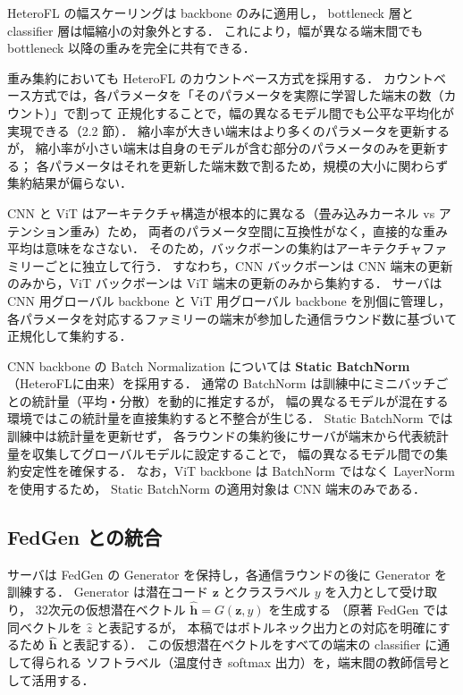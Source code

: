 HeteroFL の幅スケーリングは backbone のみに適用し，
bottleneck 層と classifier 層は幅縮小の対象外とする．
これにより，幅が異なる端末間でも bottleneck 以降の重みを完全に共有できる．

重み集約においても HeteroFL のカウントベース方式を採用する．
カウントベース方式では，各パラメータを「そのパラメータを実際に学習した端末の数（カウント）」で割って
正規化することで，幅の異なるモデル間でも公平な平均化が実現できる（2.2 節）．
縮小率が大きい端末はより多くのパラメータを更新するが，
縮小率が小さい端末は自身のモデルが含む部分のパラメータのみを更新する；
各パラメータはそれを更新した端末数で割るため，規模の大小に関わらず集約結果が偏らない．

CNN と ViT はアーキテクチャ構造が根本的に異なる（畳み込みカーネル vs アテンション重み）ため，
両者のパラメータ空間に互換性がなく，直接的な重み平均は意味をなさない．
そのため，バックボーンの集約はアーキテクチャファミリーごとに独立して行う．
すなわち，CNN バックボーンは CNN 端末の更新のみから，ViT バックボーンは ViT 端末の更新のみから集約する．
サーバは CNN 用グローバル backbone と ViT 用グローバル backbone を別個に管理し，
各パラメータを対応するファミリーの端末が参加した通信ラウンド数に基づいて正規化して集約する．

CNN backbone の Batch Normalization については \textbf{Static BatchNorm}（HeteroFL\cite{HeteroFL}に由来）を採用する．
通常の BatchNorm は訓練中にミニバッチごとの統計量（平均・分散）を動的に推定するが，
幅の異なるモデルが混在する環境ではこの統計量を直接集約すると不整合が生じる．
Static BatchNorm では訓練中は統計量を更新せず，
各ラウンドの集約後にサーバが端末から代表統計量を収集してグローバルモデルに設定することで，
幅の異なるモデル間での集約安定性を確保する．
なお，ViT backbone は BatchNorm ではなく LayerNorm を使用するため，
Static BatchNorm の適用対象は CNN 端末のみである．

\subsection{FedGen との統合}

サーバは FedGen の Generator を保持し，各通信ラウンドの後に Generator を訓練する．
Generator は潜在コード $\mathbf{z}$ とクラスラベル $y$ を入力として受け取り，
32次元の仮想潜在ベクトル $\hat{\mathbf{h}} = G(\mathbf{z}, y)$ を生成する
（原著 FedGen\cite{FedGen} では同ベクトルを $\hat{z}$ と表記するが，
本稿ではボトルネック出力との対応を明確にするため $\hat{\mathbf{h}}$ と表記する）．
この仮想潜在ベクトルをすべての端末の classifier に通して得られる
ソフトラベル（温度付き softmax 出力）を，端末間の教師信号として活用する．

